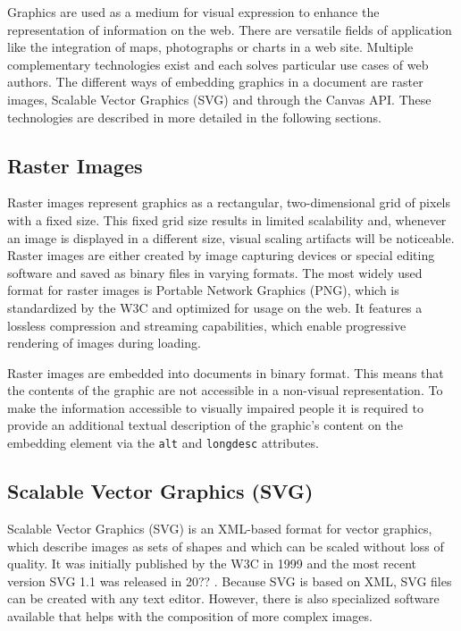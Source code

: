 Graphics are used as a medium for visual expression to enhance the representation of information on the web. There are versatile fields of application like the integration of maps, photographs or charts in a web site. Multiple complementary technologies exist and each solves particular use cases of web authors. The different ways of embedding graphics in a document are raster images, Scalable Vector Graphics (SVG) and through the Canvas API. These technologies are described in more detailed in the following sections.

\subsection{Raster Images}

Raster images represent graphics as a rectangular, two-dimensional grid of pixels with a fixed size. This fixed grid size results in limited scalability and, whenever an image is displayed in a different size, visual scaling artifacts will be noticeable. Raster images are either created by image capturing devices or special editing software and saved as binary files in varying formats. The most widely used format for raster images is Portable Network Graphics (PNG), which is standardized by the W3C \parencite{PNG} and optimized for usage on the web. It features a lossless compression and streaming capabilities, which enable progressive rendering of images during loading.

Raster images are embedded into documents in binary format. This means that the contents of the graphic are not accessible in a non-visual representation. To make the information accessible to visually impaired people it is required to provide an additional textual description of the graphic's content on the embedding element via the \lstinline{alt} and \lstinline{longdesc} attributes.

\subsection{Scalable Vector Graphics (SVG)}

Scalable Vector Graphics (SVG) is an XML-based format for vector graphics, which describe images as sets of shapes and which can be scaled without loss of quality. It was initially published by the W3C in 1999 \parencite{SVG1.0} and the most recent version SVG 1.1 was released in 20?? \parencite{SVG1.1}. Because SVG is based on XML, SVG files can be created with any text editor. However, there is also specialized software available that helps with the composition of more complex images.

